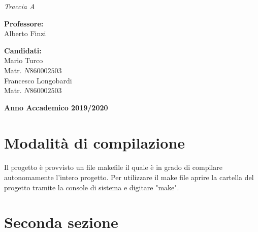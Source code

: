 \documentclass[a4paper,12pt,openright,oneside]{book}
\begin{document}
\begin{titlepage}
\begin{center}
    {{ \textit{Traccia A}}}
\end{center}
\vspace{25mm}
\par
\noindent
\begin{minipage}[t]{0.47\textwidth}
    \textbf{Professore:}\\
    Alberto Finzi\\   
\end{minipage}
\hfill
\begin{minipage}[t]{0.47\textwidth}\raggedleft
    \textbf{Candidati:}\\
    Mario Turco\\ 
    Matr. $N860002503$\\
    Francesco Longobardi\\
    Matr.  $N860002503$\\
\end{minipage}
\vspace{5.5mm}
\begin{center}
    {\large{\bf Anno Accademico 2019/2020}} 
\end{center}
\end{titlepage}
\newpage
\tableofcontents
\newpage
{}
\section{Modalità di compilazione}
\paragraph{}
Il progetto è provvisto un file makefile il quale è in grado di compilare autonomamente l'intero progetto.
Per utilizzare il make file aprire la cartella del progetto tramite la console di sistema e digitare "make".
\section{Seconda sezione}
\end{document}
